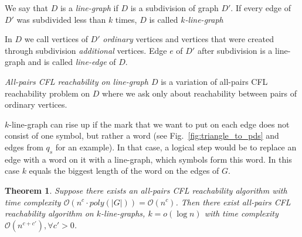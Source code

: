\documentclass[12pt]{article}
\newtheorem{theorem}{Theorem}[section]
\begin{document}
We say that $D$ is a \textit{line-graph} if $D$ is a subdivision of graph $D'$. If every edge of $D'$ was subdivided less than $k$ times, $D$ is called \textit{$k$-line-graph}

In $D$ we call vertices of $D'$ \textit{ordinary} vertices and vertices that were created through subdivision \textit{additional} vertices. Edge $e$ of $D'$ after subdivision is a line-graph and is called \textit{line-edge} of $D$.

\emph{All-pairs CFL reachability on line-graph $D$} is a variation of all-pairs CFL reachability problem on $D$ where we ask only about reachability between pairs of ordinary vertices.

$k$-line-graph can rise up if the mark that we want to put on each edge does not consist of one symbol, but rather a word (see Fig.~\ref{fig:triangle_to_pds} and edges from $q_s$ for an example). In that case, a logical step would be to replace an edge with a word on it with a line-graph, which symbols form this word. In this case $k$ equals the biggest length of the word on the edges of $G$.

\begin{theorem}
\label{th:line-edges-1}
Suppose there exists an all-pairs CFL reachability algorithm with time complexity $\mathcal{O}(n^c \cdot poly(|G|)) = \mathcal{O}(n^c)$. Then there exist all-pairs CFL reachability algorithm on $k$-line-graphs, $k = o(\log n)$ with time complexity $\mathcal{O}(n^{c+c'}), \forall c' > 0$.
\end{theorem}
\end{document}
